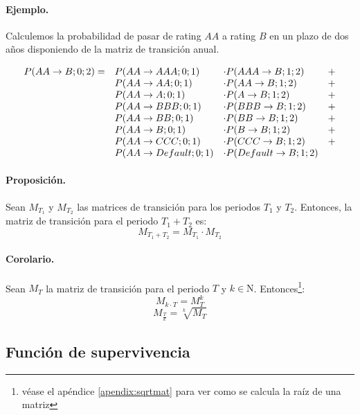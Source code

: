 \paragraph{Ejemplo.} Calculemos la probabilidad de pasar de rating $AA$ a
rating $B$ en un plazo de dos a\~nos disponiendo de la matriz de transici\'on anual.

\begin{displaymath}
\begin{array}{llll}
P(AA \to B;0;2) = & P(AA \to AAA;0;1)     & \cdot P(AAA \to B;1;2)     & + \cr
                  & P(AA \to AA;0;1)      & \cdot P(AA \to B;1;2)      & + \cr
                  & P(AA \to A;0;1)       & \cdot P(A \to B;1;2)       & + \cr
                  & P(AA \to BBB;0;1)     & \cdot P(BBB \to B;1;2)     & + \cr
                  & P(AA \to BB;0;1)      & \cdot P(BB \to B;1;2)      & + \cr
                  & P(AA \to B;0;1)       & \cdot P(B \to B;1;2)       & + \cr
                  & P(AA \to CCC;0;1)     & \cdot P(CCC \to B;1;2)     & + \cr
                  & P(AA \to Default;0;1) & \cdot P(Default \to B;1;2) &
\end{array}
\end{displaymath}

\paragraph{Proposici\'on.} Sean $M_{T_1}$ y $M_{T_2}$ las matrices de transici\'on
para los periodos $T_1$ y $T_2$. Entonces, la matriz de transici\'on para el
periodo $T_1+T_2$ es:
\begin{displaymath}
M_{T_1+T_2} = M_{T_1} \cdot M_{T_2}
\end{displaymath}

\paragraph{Corolario.} Sean $M_{T}$ la matriz de transici\'on para el periodo 
$T$ y $k \in \mathrm{N}$. Entonces\footnote{v\'ease el ap\'endice \ref{apendix:sqrtmat} 
para ver como se calcula la ra\'iz de una matriz}:
\begin{displaymath}
M_{k \cdot T} = M_{T}^k
\end{displaymath}
\begin{displaymath}
M_{\frac{T}{k}} = \sqrt[k]{M_{T}}
\end{displaymath}


\subsection{Funci\'on de supervivencia}


